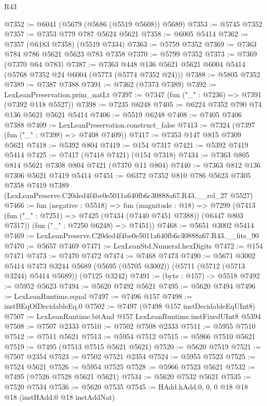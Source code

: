 \begin{lexlean}{R43}
\begin{coremodule}
@7352 := @6041 (@5679 (@5686 (@5519 @5608)) @5689)
@7353 := @5745 @7352
@7357 := @7353 @779 @787 @5624 @5621
@7358 := @6005 @5414
@7362 := @7357 (@6183 @7358) (@5519 @7334)
@7363 := @5759 @7352
@7369 := @7363 @784 @786 @5621 @5623 @783 @7358
@7370 := @5799 @7352
@7373 := @7369 (@7370 @64 @783)
@7387 := @7363 @448 @136 @5621 @5621 @6004 @5414 (@5768 @7352 @24 @6004 (@5773 (@5774 @7352 @24)))
@7388 := @5805 @7352
@7389 := @7387 @7388
@7391 := @7362 (@7373 @7389)
@7392 := LexLeanPreservation.prim_natLt
@7397 := @7347 (fun ("_" : @7236) => @7391 (@7392 @118 @5527))
@7398 := @7235 @6248
@7405 := @6224 @7352 @790 @74 @136 @5621 @5621 @5414
@7406 := @5519 @6248
@7408 := @7405 @7406 @7388
@7409 := LexLeanPreservation.construct_false
@7413 := @7324 (@7397 (fun ("_" : @7398) => @7408 @7409))
@7417 := @7353 @147 @815 @7309 @5621
@7418 := @5392 @804
@7419 := @154 @7317
@7421 := @5392 @7419 @5414
@7425 := @7417 (@7418 @7421) (@154 @7318)
@7434 := @7363 @805 @814 @5621 @7308 @804 @7421 (@7370 @11 @804)
@7440 := @7363 @812 @136 @7306 @5621 @7419 @5414
@7451 := @6372
    @7352
    @810
    @786
    @5623
    @7305
    @7358
    @7419
    @7389
    (LexLeanPreserve.C20ded4f4be0e5011a640fb6c30888a67.R43.__rel_27 @5527)
@7466 := fun (negative : @5518) =>
  fun (magnitude : @18) =>
  @7299
    (@7413
      (fun ("_" : @7251) => @7425 (@7434 (@7440 @7451 @7388)) (@6447 @803 @7317))
      (fun ("_" : @7250 @6248) => @7451))
@7468 := @5651 @3002 @5414
@7469 := LexLeanPreserve.C20ded4f4be0e5011a640fb6c30888a67.R43.__fits_90
@7470 := @5657 @7469
@7471 := LexLeanStd.Numeral.hexDigits
@7472 := @154 @7471
@7473 := @7470 @7472
@7474 := @7468 @7473
@7490 := @5671
    @3002
    @5414
    @7473
    @3244
    @5689
    (@5695 (@5705 @3002))
    (@5711 (@5712 (@5713 @3244) @5414 @5689))
    (@7125 @3242)
@7491 := (byte : @157) -> @5518
@7492 := @5952 @5623
@7494 := @5620 @7492 @5621
@7495 := @5620 @7494
@7496 := LexLeanRuntime.equal
@7497 := @7496 @157
@7498 := instBEqOfDecidableEq.{0}
@7502 := @7497 (@7498 @157 instDecidableEqUInt8)
@7507 := LexLeanRuntime.bitAnd @157 LexLeanRuntime.instFixedUInt8 @5394
@7508 := @7507 @2333
@7510 := @7502 @7508 @2333
@7511 := @5955 @7510
@7512 := @7511 @5621
@7513 := @5954 @7512
@7515 := @5966 @7510 @5621
@7519 := @7495 (@7513 @7515 @5621 @5621)
@7520 := @5620 @7519
@7521 := @7507 @2354
@7523 := @7502 @7521 @2354
@7524 := @5955 @7523
@7525 := @7524 @5621
@7526 := @5954 @7525
@7528 := @5966 @7523 @5621
@7532 := @7495 (@7526 @7528 @5621 @5621)
@7534 := @5620 @7532 @5621
@7535 := @7520 @7534
@7536 := @5620 @7535
@7545 := HAdd.hAdd.{0, 0, 0} @18 @18 @18 (instHAdd.{0} @18 instAddNat)

\end{coremodule}
\end{lexlean}
